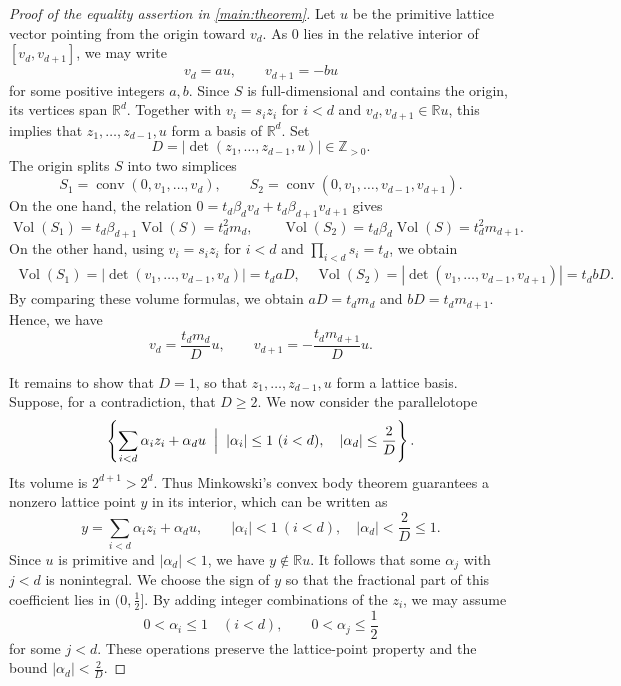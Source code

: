 \documentclass[reqno, 11pt]{article}
\numberwithin{equation}{section}
\theoremstyle{definition}
\begin{document}
\begin{proof}[Proof of the equality assertion in \cref{main:theorem}]
Let $u$ be the primitive lattice vector pointing from the origin toward $v_d$. As $0$ lies in the relative interior of $[v_d,v_{d+1}]$, we may write
\[
v_d=au,\qquad v_{d+1}=-bu
\]
for some positive integers $a,b$. 
Since $S$ is full-dimensional and contains the origin, its vertices span $\mathbb R^d$. Together with $v_i=s_iz_i$ for $i<d$ and $v_d,v_{d+1}\in\mathbb Ru$, this implies that $z_1,\ldots,z_{d-1},u$ form a basis of $\mathbb R^d$. Set
\[
D=|\det(z_1,\ldots,z_{d-1},u)|\in\mathbb Z_{>0}.
\]
The origin splits $S$ into two simplices
\[
S_1=\operatorname{conv}(0,v_1,\ldots,v_d),
\qquad
S_2=\operatorname{conv}(0,v_1,\ldots,v_{d-1},v_{d+1}).
\]
On the one hand, the relation $0=t_d\beta_dv_d+t_d\beta_{d+1}v_{d+1}$ gives
\[
\operatorname{Vol}(S_1)=t_d\beta_{d+1}\operatorname{Vol}(S)=t_d^2 m_d,
\qquad
\operatorname{Vol}(S_2)=t_d\beta_d\operatorname{Vol}(S)=t_d^2 m_{d+1}.
\]
On the other hand, using $v_i=s_iz_i$ for $i<d$
and $\prod_{i<d}s_i=t_d$, we obtain
\[
\begin{aligned}
\operatorname{Vol}(S_1)
=|\det(v_1,\ldots,v_{d-1},v_d)|
=t_daD,\quad
\operatorname{Vol}(S_2)
=|\det(v_1,\ldots,v_{d-1},v_{d+1})|
=t_dbD.
\end{aligned}
\]
By comparing these volume formulas, we obtain $aD=t_dm_d$ and $bD=t_dm_{d+1}$. Hence, we have 
\[
v_d=\frac{t_dm_d}{D}u,\qquad
v_{d+1}=-\frac{t_dm_{d+1}}{D}u.
\]


It remains to show that $D=1$, so that $z_1,\ldots,z_{d-1},u$ form a lattice basis. Suppose, for a contradiction, that $D\ge2$. We now consider the parallelotope
\[
\left\{\sum_{i<d}\alpha_i z_i+\alpha_d u
\;\Bigm|\;
|\alpha_i|\le1\ (i<d),\quad
|\alpha_d|\le\frac2D\right\}.
\]
Its volume is $2^{d+1}>2^d$. Thus Minkowski's convex body theorem
guarantees a nonzero lattice point $y$ in its interior, which can be written as
\[
y=\sum_{i<d}\alpha_i z_i+\alpha_du,
\qquad
|\alpha_i|<1\ (i<d),\quad
|\alpha_d|<\frac2D\le1.
\]
Since $u$ is primitive and $|\alpha_d|<1$, we have $y\notin\mathbb Ru$. It follows that some $\alpha_j$ with $j<d$ is nonintegral. We choose the sign of $y$ so that the fractional part of this coefficient
lies in $(0,\frac12]$. By adding integer combinations of the $z_i$, we may assume
\[
0<\alpha_i\le1\quad(i<d),\qquad
0<\alpha_j\le\frac12
\]
for some $j<d$. These operations preserve the lattice-point property
and the bound $|\alpha_d|<\frac2D$.



\end{proof}
\end{document}
